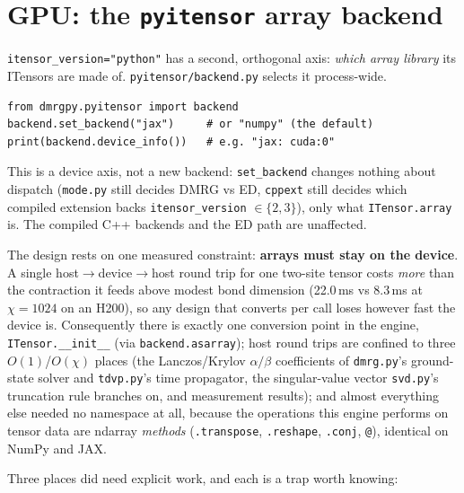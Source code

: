 \documentclass[11pt]{article}
\begin{document}
\section{GPU: the \texttt{pyitensor} array backend}

\texttt{itensor\_version="python"} has a second, orthogonal axis: \emph{which
array library} its ITensors are made of. \texttt{pyitensor/backend.py}
selects it process-wide.

\begin{verbatim}
from dmrgpy.pyitensor import backend
backend.set_backend("jax")     # or "numpy" (the default)
print(backend.device_info())   # e.g. "jax: cuda:0"
\end{verbatim}

This is a device axis, not a new backend: \texttt{set\_backend} changes
nothing about dispatch (\texttt{mode.py} still decides DMRG vs ED,
\texttt{cppext} still decides which compiled extension backs
\texttt{itensor\_version} $\in \{2,3\}$), only what \texttt{ITensor.array}
is. The compiled C++ backends and the ED path are unaffected.

The design rests on one measured constraint: \textbf{arrays must stay on
the device}. A single host$\to$device$\to$host round trip for one two-site
tensor costs \emph{more} than the contraction it feeds above modest bond
dimension (22.0\,ms vs 8.3\,ms at $\chi=1024$ on an H200), so any design
that converts per call loses however fast the device is. Consequently
there is exactly one conversion point in the engine,
\texttt{ITensor.\_\_init\_\_} (via \texttt{backend.asarray}); host round
trips are confined to three $O(1)$/$O(\chi)$ places (the Lanczos/Krylov
$\alpha/\beta$ coefficients of \texttt{dmrg.py}'s ground-state solver and
\texttt{tdvp.py}'s time propagator, the singular-value vector
\texttt{svd.py}'s truncation rule branches on, and measurement results);
and almost
everything else needed no namespace at all, because the operations this
engine performs on tensor data are ndarray \emph{methods}
(\texttt{.transpose}, \texttt{.reshape}, \texttt{.conj}, \texttt{@}),
identical on NumPy and JAX.

Three places did need explicit work, and each is a trap worth knowing:
\end{document}
